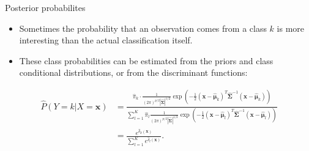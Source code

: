\documentclass[10pt,ignorenonframetext,]{beamer}
\providecommand{\tightlist}{%
  \setlength{\itemsep}{0pt}\setlength{\parskip}{0pt}}
\begin{document}
\begin{frame}

\begin{block}{Posterior probabilites}

\vspace{2mm}

\begin{itemize}
\tightlist
\item
  Sometimes the probability that an observation comes from a class \(k\)
  is more interesting than the actual classification itself.
\end{itemize}

\vspace{2mm}

\begin{itemize}
\tightlist
\item
  These class probabilities can be estimated from the priors and class
  conditional distributions, or from the discriminant functions:
\end{itemize}

\begin{align*}\hat{P}(Y=k | X=\boldsymbol{x})&=
\frac{\hat{\pi}_k \cdot \frac{1}{(2 \pi)^{p/2}|\hat{\boldsymbol{\Sigma}}|^{1/2}} \exp(-\frac{1}{2}
(\boldsymbol{x}-\hat{\boldsymbol\mu}_k)^T \hat{\boldsymbol{\Sigma}}^{-1}
(\boldsymbol{x}-\hat{\boldsymbol\mu}_k))}
{\sum_{l=1}^K \hat{\pi}_l 
\frac{1}{(2 \pi)^{p/2}|\hat{\boldsymbol{\Sigma}}|^{1/2}}
\exp(-\frac{1}{2}
(\boldsymbol{x}-\hat{\boldsymbol\mu}_l)^T 
\hat{\boldsymbol{\Sigma}}^{-1}
(\boldsymbol{x}-\hat{\boldsymbol\mu}_l))}\\
&=
\frac{e^{\hat{\delta}_k(\boldsymbol{x})}}{\sum_{l=1}^K e^{\hat{\delta}_l(\boldsymbol{x})}}.\end{align*}

\end{block}

\end{frame}
\end{document}
